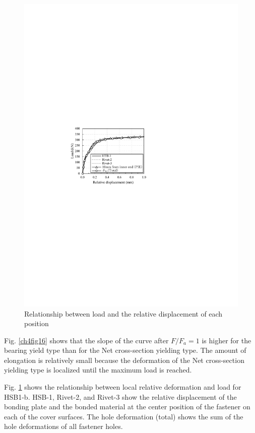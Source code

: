 \begin{figure}[htbp]
\begin{minipage}[t]{0.48\textwidth}
    \includegraphics[width=\linewidth]{imgs/ch4/fig17.pdf}
    \caption{Relationship between load and the relative displacement of each position}
    \label{ch4fig17}
    \end{minipage}
\end{figure}

Fig. \ref{ch4fig16} shows that the slope of the curve after $F / F_a = 1$ is higher for the bearing yield type than for the Net cross-section yielding type. The amount of elongation is relatively small because the deformation of the Net cross-section yielding type is localized until the maximum load is reached.

Fig. \ref{ch4fig17} shows the relationship between local relative deformation and load for HSB1-b. HSB-1, Rivet-2, and Rivet-3 show the relative displacement of the bonding plate and the bonded material at the center position of the fastener on each of the cover surfaces. The hole deformation (total) shows the sum of the hole deformations of all fastener holes.

